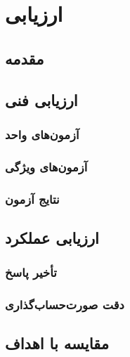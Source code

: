 \chapter{ارزیابی}
\label{ch:evaluation}

\section{مقدمه}
\section{ارزیابی فنی}
\subsection{آزمون‌های واحد}
\subsection{آزمون‌های ویژگی}
\subsection{نتایج آزمون}
\section{ارزیابی عملکرد}
\subsection{تأخیر پاسخ}
\subsection{دقت صورت‌حساب‌گذاری}
\section{مقایسه با اهداف}
